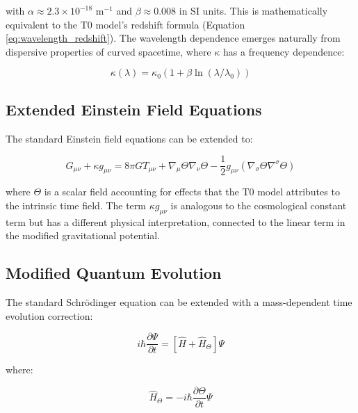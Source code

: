\documentclass[twocolumn,aps,prl]{revtex4-2}
\begin{document}
	with \(\alpha \approx 2.3 \times 10^{-18}\) m\(^{-1}\) and \(\beta \approx 0.008\) in SI units. This is mathematically equivalent to the T0 model's redshift formula (Equation \ref{eq:wavelength_redshift}). The wavelength dependence emerges naturally from dispersive properties of curved spacetime, where \(\kappa\) has a frequency dependence:
	
	\begin{equation}
		\kappa(\lambda) = \kappa_0(1 + \beta \ln(\lambda/\lambda_0))
		\label{eq:kappa_wavelength}
	\end{equation}
	
	\subsection{Extended Einstein Field Equations}
	\label{subsec:extended_einstein}
	
	The standard Einstein field equations can be extended to:
	
	\begin{equation}
		G_{\mu\nu} + \kappa g_{\mu\nu} = 8\pi G T_{\mu\nu} + \nabla_{\mu}\Theta\nabla_{\nu}\Theta - \frac{1}{2}g_{\mu\nu}(\nabla_{\sigma}\Theta\nabla^{\sigma}\Theta)
		\label{eq:extended_einstein}
	\end{equation}
	
	where \(\Theta\) is a scalar field accounting for effects that the T0 model attributes to the intrinsic time field. The term \(\kappa g_{\mu\nu}\) is analogous to the cosmological constant term but has a different physical interpretation, connected to the linear term in the modified gravitational potential.
	
	\subsection{Modified Quantum Evolution}
	\label{subsec:quantum_evolution}
	
	The standard Schrödinger equation can be extended with a mass-dependent time evolution correction:
	
	\begin{equation}
		i\hbar\frac{\partial\Psi}{\partial t} = [\hat{H} + \hat{H}_{\Theta}]\Psi
		\label{eq:extended_schrodinger}
	\end{equation}
	
	where:
	
	\begin{equation}
		\hat{H}_{\Theta} = -i\hbar\frac{\partial\Theta}{\partial t}\Psi
		\label{eq:h_theta}
	\end{equation}
	
\end{document}
